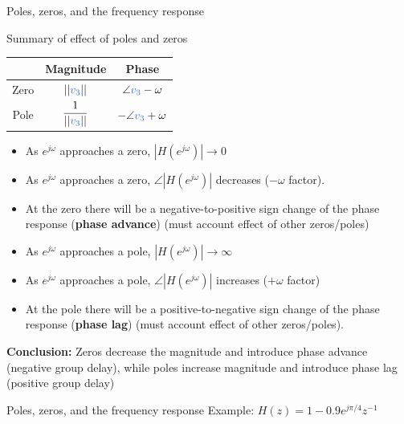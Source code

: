 \documentclass[10pt, handout]{beamer}
\begin{document}
%
\begin{frame}{Poles, zeros, and the frequency response}

Summary of effect of poles and zeros

\begin{center}
	\begin{tabular}{c|c|c}
	& Magnitude & Phase \\
	\hline
	Zero & $||{\color{blue2} v_3}||$ & $\angle {\color{blue2} v_3} - \omega$ \\
	Pole & $\displaystyle\frac{1}{||{\color{blue2} v_3}||}$ & $-\angle {\color{blue2} v_3} + \omega$ \\
	\hline
\end{tabular}
\end{center}

\begin{itemize}
	\pause\item As $e^{j\omega}$ approaches a zero, $|H(e^{j\omega})| \to 0$
	\pause\item As $e^{j\omega}$ approaches a zero, $\angle |H(e^{j\omega})|$ decreases ($- \omega$ factor).
	\pause\item At the zero there will be a negative-to-positive sign change of the phase response (\textbf{phase advance}) (must account effect of other zeros/poles)
	\pause\item As $e^{j\omega}$ approaches a pole, $|H(e^{j\omega})| \to \infty$
	\pause\item As $e^{j\omega}$ approaches a pole, $\angle |H(e^{j\omega})|$ increases ($+ \omega$ factor)
	\pause\item At the pole there will be a positive-to-negative sign change of the phase response (\textbf{phase lag}) (must account effect of other zeros/poles).	
\end{itemize}

\pause
\textbf{Conclusion:} Zeros decrease the magnitude and introduce phase advance (negative group delay), while poles increase magnitude and introduce phase lag (positive group delay)

\end{frame}

%
\begin{frame}{Poles, zeros, and the frequency response}
	Example: $H(z) = 1 - 0.9e^{j\pi/4}z^{-1}$
	\begin{center}
		\resizebox{\linewidth}{!}{}
	\end{center}	
\end{frame}
\end{document}
